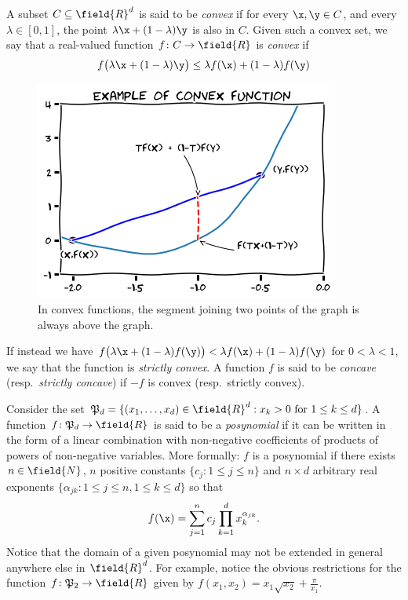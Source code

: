 \begin{example}\label{example:convexFunction}
A subset $C \subseteq \field{R}^d$ is said to be \emph{convex} if for every $\x, \y \in C$, and every $\lambda \in [0,1]$, the point $\lambda \x + (1-\lambda) \y$ is also in $C$.   Given such a convex set, we say that a real-valued function $f \colon C \to \field{R}$ is \emph{convex} if 
\begin{equation*}
f\big(\lambda \x + (1-\lambda)\y\big) \leq \lambda f(\x) + (1-\lambda) f(\y)
\end{equation*}
\begin{figure}[ht!]
\includegraphics[width=0.5\linewidth]{convexFunction.png}
\caption{In convex functions, the segment joining two points of the graph is always above the graph.}
\label{figure:convexFunction}
\end{figure}
If instead we have $f\big(\lambda \x + (1-\lambda)f(\y)\big) < \lambda f(\x) + (1-\lambda) f(\y)$ for $0<\lambda<1$, we say that the function is \emph{strictly convex}.  A function $f$ is said to be \emph{concave} (resp.~\emph{strictly concave}) if $-f$ is convex (resp.~strictly convex).
\end{example}

\begin{example}[Posynomials]\label{example:posynomial}
Consider the set $\mathfrak{P}_d = \{ (x_1, \dotsc, x_d) \in \field{R}^d : x_k > 0 \text{ for } 1\leq k \leq d\}$. A function $f \colon \mathfrak{P}_d \to \field{R}$ is said to be a \emph{posynomial} if it can be written in the form of a linear combination with non-negative coefficients of products of powers of non-negative variables.  More formally: $f$ is a posynomial if there exists $n \in \field{N}$, $n$ positive constants $\{ c_j : 1 \leq j \leq n \}$ and $n \times d$ arbitrary real exponents $\{ \alpha_{jk} : 1\leq j \leq n, 1 \leq k \leq d \}$ so that 
\begin{equation*}
f(\x) = \sum_{j=1}^n c_j \prod_{k=1}^d x_k^{\alpha_{jk}}.
\end{equation*}
Notice that the domain of a given posynomial may not be extended in general anywhere else in $\field{R}^d$.  For example, notice the obvious restrictions for the function $f\colon \mathfrak{P}_2 \to \field{R}$ given by $f(x_1,x_2) = x_1\sqrt{x_2} + \frac{\pi}{x_1}$.
\end{example}

